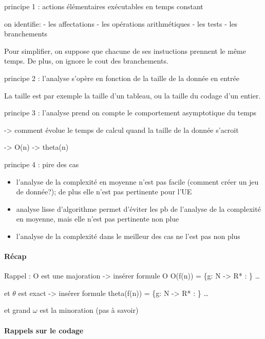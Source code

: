 principe 1 : actions élémentaires exécutables en temps constant

on identifie: - les affectations - les opérations arithmétiques - les
tests - les branchements

Pour simplifier, on suppose que chacune de ses instuctions prennent le
même temps. De plus, on ignore le cout des branchements.

principe 2 : l'analyse s'opère en fonction de la taille de la donnée en
entrée

La taille est par exemple la taille d'un tableau, ou la taille du codage
d'un entier.

principe 3 : l'analyse prend on compte le comportement asymptotique du
temps

-\textgreater{} comment évolue le temps de calcul quand la taille de la
donnée s'acroit

-\textgreater{} O(n) -\textgreater{} theta(n)

principe 4 : pire des cas

\begin{itemize}
\tightlist
\item
  l'analyse de la complexité en moyenne n'est pas facile (comment créer
  un jeu de donnée?); de plus elle n'est pas pertinente pour l'UE
\item
  analyse lisse d'algorithme permet d'éviter les pb de l'analyse de la
  complexité en moyenne, mais elle n'est pas pertinente non plue
\item
  l'analyse de la complexité dans le meilleur des cas ne l'est pas non
  plus
\end{itemize}

\hypertarget{ruxe9cap}{%
\paragraph{Récap}\label{ruxe9cap}}

Rappel : O est une majoration -\textgreater{} insérer formule O O(f(n))
= \{g: N -\textgreater{} R* : \} \ldots{}

et \(\theta\) est exact -\textgreater{} insérer formule theta(f(n)) =
\{g: N -\textgreater{} R* : \} \ldots{}

et grand $\omega$ est la minoration (pas à savoir)

\hypertarget{rappels-sur-le-codage}{%
\paragraph{Rappels sur le codage}\label{rappels-sur-le-codage}}

